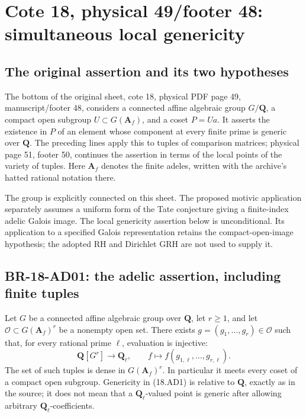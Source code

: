 \section{Cote 18, physical 49/footer 48: simultaneous local genericity}

\subsection{The original assertion and its two hypotheses}
The bottom of the original sheet, cote 18, physical PDF page 49,
manuscript/footer 48, considers a connected affine algebraic group
\(G/\mathbf Q\), a compact open subgroup
\(U\subset G(\mathbf A_f)\), and a coset \(P=Ua\).
It asserts the existence in \(P\) of an element whose component at
every finite prime is generic over \(\mathbf Q\).  The preceding
lines apply this to tuples of comparison matrices; physical page 51,
footer 50, continues the assertion in terms of the local points of
the variety of tuples.  Here \(\mathbf A_f\) denotes the finite
adeles, written with the archive's hatted rational notation there.

The group is explicitly connected on this sheet.  The proposed
motivic application separately assumes a uniform form of the Tate
conjecture giving a finite-index adelic Galois image.  The local
genericity assertion below is unconditional.  Its application to a
specified Galois representation retains the compact-open-image
hypothesis; the adopted RH and Dirichlet GRH are not used to supply it.

\subsection{BR-18-AD01: the adelic assertion, including finite tuples}
Let \(G\) be a connected affine algebraic group over \(\mathbf Q\),
let \(r\geq1\), and let
\(\mathcal O\subset G(\mathbf A_f)^r\) be a nonempty open set.
There exists \(g=(g_1,\ldots,g_r)\in\mathcal O\) such that,
for every rational prime \(\ell\), evaluation is injective:
\[
 \mathbf Q[G^r]\longrightarrow\mathbf Q_\ell,
 \qquad f\longmapsto f(g_{1,\ell},\ldots,g_{r,\ell}).
 \tag{18.AD1}
\]
The set of such tuples is dense in \(G(\mathbf A_f)^r\).
In particular it meets every coset of a compact open subgroup.
Genericity in (18.AD1) is relative to \(\mathbf Q\), exactly as in
the source; it does not mean that a \(\mathbf Q_\ell\)-valued point
is generic after allowing arbitrary \(\mathbf Q_\ell\)-coefficients.

